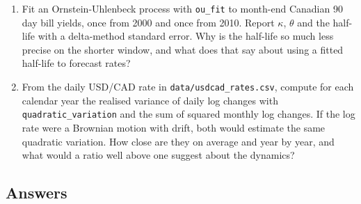 \begin{chapterrefs}
\begin{enumerate}[label=\textbf{P3.\arabic*}, leftmargin=*, ref=P3.\arabic*]
\item Fit an Ornstein-Uhlenbeck process with \texttt{ou\_fit} to month-end Canadian 90 day bill yields,
once from 2000 and once from 2010. Report $\kappa$, $\theta$ and the half-life with a delta-method
standard error. Why is the half-life so much less precise on the shorter window, and what does that say
about using a fitted half-life to forecast rates?
\item From the daily USD/CAD rate in \texttt{data/usdcad\_rates.csv}, compute for each calendar year the
realised variance of daily log changes with \texttt{quadratic\_variation} and the sum of squared monthly
log changes. If the log rate were a Brownian motion with drift, both would estimate the same quadratic
variation. How close are they on average and year by year, and what would a ratio well above one
suggest about the dynamics?
\end{enumerate}

\subsection*{Answers}


\end{chapterrefs}
